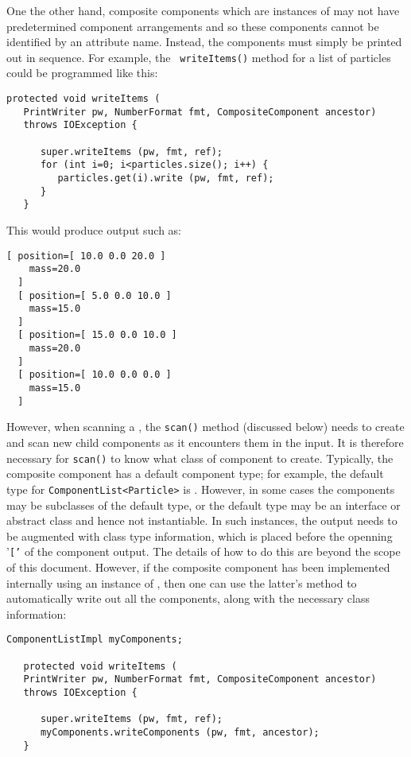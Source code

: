 \documentclass{article}
\begin{document}
One the other hand, composite components which are instances of
 may
not have predetermined component arrangements and so these components
cannot be identified by an attribute name. Instead, the components
must simply be printed out in sequence.  For example, the {\tt
writeItems()} method for a list of particles could be programmed like
this:
\begin{lstlisting}[]
   protected void writeItems (
   PrintWriter pw, NumberFormat fmt, CompositeComponent ancestor) 
   throws IOException {

      super.writeItems (pw, fmt, ref);
      for (int i=0; i<particles.size(); i++) {
         particles.get(i).write (pw, fmt, ref);
      }
   }   
\end{lstlisting}
This would produce output such as:
\begin{lstlisting}[]
  [ position=[ 10.0 0.0 20.0 ]
    mass=20.0
  ]
  [ position=[ 5.0 0.0 10.0 ]
    mass=15.0
  ]
  [ position=[ 15.0 0.0 10.0 ]
    mass=20.0
  ]
  [ position=[ 10.0 0.0 0.0 ]
    mass=15.0
  ]
\end{lstlisting}
However, when scanning a
, the
{\tt scan()} method (discussed below) needs to create and scan new
child components as it encounters them in the input.  It is therefore
necessary for {\tt scan()} to know what class of component to create.
Typically, the composite component has a default component
type; for example, the default type for {\tt ComponentList<Particle>}
is . However, in some
cases the components may be subclasses of the default type, or the
default type may be an interface or abstract class and hence not
instantiable. In such instances, the output needs to be augmented with
class type information, which is placed before the openning '{\tt ['}
of the component output.  The details of how to do
this are beyond the scope of this document. However,
if the composite component has been implemented internally using
an instance of 
,
then one can use the latter's
method to automatically write out all the components, along with the necessary
class information:
\begin{lstlisting}[]
   ComponentListImpl myComponents; 

   protected void writeItems (
   PrintWriter pw, NumberFormat fmt, CompositeComponent ancestor) 
   throws IOException {

      super.writeItems (pw, fmt, ref);
      myComponents.writeComponents (pw, fmt, ancestor);
   }
\end{lstlisting}
\end{document}
